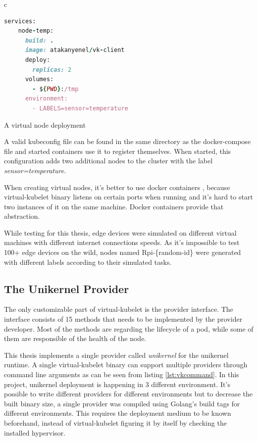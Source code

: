 \begin{code}[htpb]
  \centering
  \begin{tabular}{c}
  \begin{lstlisting}[language=ruby]
    services:
    node-temp:
      build: .
      image: atakanyenel/vk-client
      deploy:
        replicas: 2
      volumes:
        - ${PWD}:/tmp
      environment:
        - LABELS=sensor=temperature
\end{lstlisting}
\end{tabular}
\caption{A virtual node deployment}\label{fig:docker-compose}
\end{code}


A valid kubeconfig file can be found in the same directory as the docker-compose file and started containers use it to register themselves. When started, this configuration adds two additional nodes to the cluster with the label \textit{sensor=temperature}.

When creating virtual nodes, it's better to use docker containers , because virtual-kubelet binary listens on certain ports when running and it's hard to start two instances of it on the same machine. Docker containers provide that abstraction.

While testing for this thesis, edge devices were simulated on different virtual machines with different internet connections speeds. As it's impossible to test 100+ edge devices on the wild, nodes named Rpi-\{random-id\} were generated with different labels according to their simulated tasks.

\subsection{The Unikernel Provider}
The only customizable part of virtual-kubelet is the provider interface. The interface consists of 15 methods that needs to be implemented by the provider developer. Most of the methods are regarding the lifecycle of a pod, while some of them are responsible of the health of the node. 

This thesis implements a single provider called \textit{unikernel} for the unikernel runtime. A single virtual-kubelet binary can support multiple providers through command line arguments as can be seen from listing \ref{lst:vkcommand}. In this project, unikernel deployment is happening in 3 different environment. It's possible to write different providers for different environments but to decrease the built binary size, a single provider was compiled using Golang's build tags for different environments. This requires the deployment medium to be known beforehand, instead of virtual-kubelet figuring it by itself by checking the installed hypervisor.

